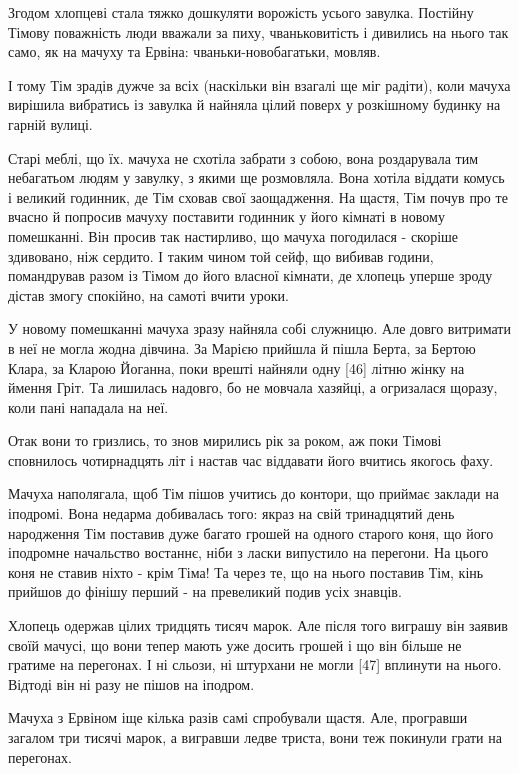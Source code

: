 Згодом хлопцеві стала тяжко дошкуляти ворожість усього завулка. Постійну Тімову поважність люди вважали за пиху, чваньковитість і дивились на нього так само, як на мачуху та Ервіна: чваньки-новобагатьки, мовляв.

І тому Тім зрадів дужче за всіх (наскільки він взагалі ще міг радіти), коли мачуха вирішила вибратись із завулка й найняла цілий поверх у розкішному будинку на гарній вулиці.

Старі меблі, що їх. мачуха не схотіла забрати з собою, вона роздарувала тим небагатьом людям у завулку, з якими ще розмовляла. Вона хотіла віддати комусь і великий годинник, де Тім сховав свої заощадження. На щастя, Тім почув про те вчасно й попросив мачуху поставити годинник у його кімнаті в новому помешканні. Він просив так настирливо, що мачуха погодилася - скоріше здивовано, ніж сердито. І таким чином той сейф, що вибивав години, помандрував разом із Тімом до його власної кімнати, де хлопець уперше зроду дістав змогу спокійно, на самоті вчити уроки.

У новому помешканні мачуха зразу найняла собі служницю. Але довго витримати в неї не могла жодна дівчина. За Марією прийшла й пішла Берта, за Бертою Клара, за Кларою Йоганна, поки врешті найняли одну [46] літню жінку на ймення Гріт. Та лишилась надовго, бо не мовчала хазяйці, а огризалася щоразу, коли пані нападала на неї.

Отак вони то гризлись, то знов мирились рік за роком, аж поки Тімові сповнилось чотирнадцять літ і настав час віддавати його вчитись якогось фаху.

Мачуха наполягала, щоб Тім пішов учитись до контори, що приймає заклади на іподромі. Вона недарма добивалась того: якраз на свій тринадцятий день народження Тім поставив дуже багато грошей на одного старого коня, що його іподромне начальство востаннє, ніби з ласки випустило на перегони. На цього коня не ставив ніхто - крім Тіма! Та через те, що на нього поставив Тім, кінь прийшов до фінішу перший - на превеликий подив усіх знавців.

Хлопець одержав цілих тридцять тисяч марок. Але після того виграшу він заявив своїй мачусі, що вони тепер мають уже досить грошей і що він більше не гратиме на перегонах. І ні сльози, ні штурхани не могли [47] вплинути на нього. Відтоді він ні разу не пішов на іподром.

Мачуха з Ервіном іще кілька разів самі спробували щастя. Але, програвши загалом три тисячі марок, а вигравши ледве триста, вони теж покинули грати на перегонах.

